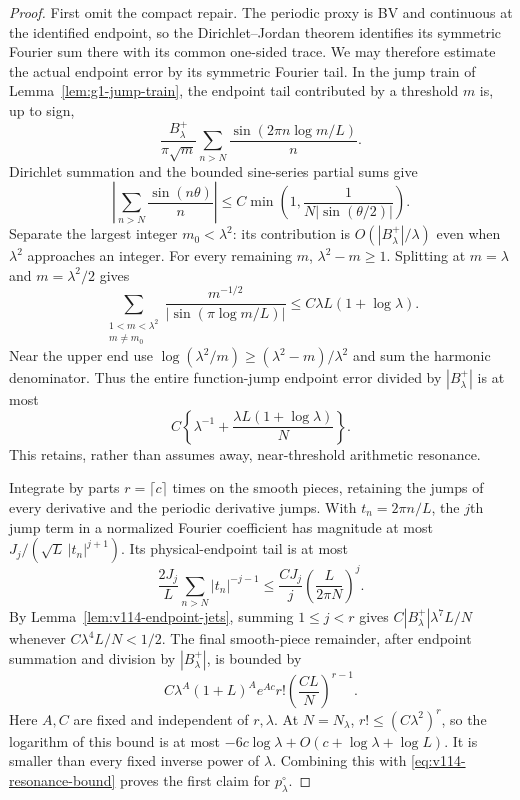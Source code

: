 \documentclass[11pt]{article}
\theoremstyle{remark}
\begin{document}
\begin{proof}
First omit the compact repair. The periodic proxy is BV and continuous
at the identified endpoint, so the Dirichlet--Jordan theorem identifies
its symmetric Fourier sum there with its common one-sided trace. We may
therefore estimate the actual endpoint error by its symmetric Fourier tail.
In the jump train of
Lemma~\ref{lem:g1-jump-train}, the endpoint tail contributed by a threshold
$m$ is, up to sign,
\[
 \frac{B_\lambda^+}{\pi\sqrt m}
       \sum_{n>N}\frac{\sin(2\pi n\log m/L)}n.
\]
Dirichlet summation and the bounded sine-series partial sums give
\[
 \left|\sum_{n>N}\frac{\sin(n\theta)}n\right|
       \le C\min\left(1,\frac1{N|\sin(\theta/2)|}\right).
\]
Separate the largest integer $m_0<\lambda^2$: its contribution is
$O(|B_\lambda^+|/\lambda)$ even when $\lambda^2$ approaches an integer.
For every remaining $m$, $\lambda^2-m\ge1$. Splitting at $m=\lambda$
and $m=\lambda^2/2$ gives
\[
 \sum_{\substack{1<m<\lambda^2\\m\ne m_0}}
 \frac{m^{-1/2}}{|\sin(\pi\log m/L)|}
       \le C\lambda L(1+\log\lambda).
\]
Near the upper end use
$\log(\lambda^2/m)\ge(\lambda^2-m)/\lambda^2$ and sum the harmonic
denominator. Thus the entire function-jump endpoint error divided by
$|B_\lambda^+|$ is at most
\begin{equation}\label{eq:v114-resonance-bound}
 C\left\{\lambda^{-1}+\frac{\lambda L(1+\log\lambda)}N\right\}.
\end{equation}
This retains, rather than assumes away, near-threshold arithmetic resonance.

Integrate by parts $r=\lceil c\rceil$ times on the smooth pieces, retaining
the jumps of every derivative and the periodic derivative jumps. With
$t_n=2\pi n/L$, the $j$th jump term in a normalized Fourier coefficient
has magnitude at most $J_j/(\sqrt L\,|t_n|^{j+1})$. Its physical-endpoint
tail is at most
\[
 \frac{2J_j}{L}\sum_{n>N}|t_n|^{-j-1}
       \le \frac{C J_j}{j}\left(\frac L{2\pi N}\right)^j.
\]
By Lemma~\ref{lem:v114-endpoint-jets}, summing $1\le j<r$ gives
$C|B_\lambda^+|\lambda^7L/N$ whenever $C\lambda^4L/N<1/2$.
The final smooth-piece remainder, after endpoint summation and division by
$|B_\lambda^+|$, is bounded by
\begin{equation}\label{eq:v114-analytic-tail}
 C\lambda^A(1+L)^Ae^{Ac}r!
                 \left(\frac{CL}{N}\right)^{r-1}.
\end{equation}
Here $A,C$ are fixed and independent of $r,\lambda$.
At $N=N_\lambda$, $r!\le(C\lambda^2)^r$, so the logarithm of this bound
is at most $-6c\log\lambda+O(c+\log\lambda+\log L)$.
It is smaller than every fixed inverse power of $\lambda$.
Combining this with \eqref{eq:v114-resonance-bound} proves the first
claim for $p_\lambda^\circ$.


\end{proof}
\end{document}
